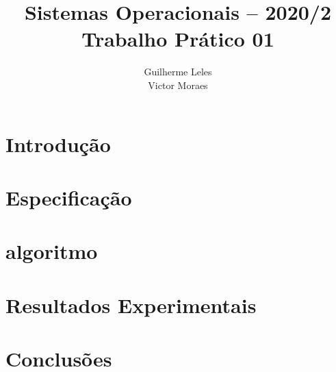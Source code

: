 \documentclass[journal]{IEEEtran}
\begin{document}
       
\title{\huge Sistemas Operacionais – 2020/2
	   \huge \\ Trabalho Prático 01}

\author{Guilherme Leles \\ Victor Moraes}

\maketitle

\begin{abstract}
	
\end{abstract}

\IEEEpeerreviewmaketitle

\section{Introdução}
    
    
\section{Especificação}\label{Sec:EspecifDesemp}
    

\section{algoritmo}\label{Sec:algoritmo}
    
    
\section{Resultados Experimentais}\label{Sec:resultados}
	
	
\section{Conclusões}\label{Sec:ConsiderFinais}
	



\end{document}
